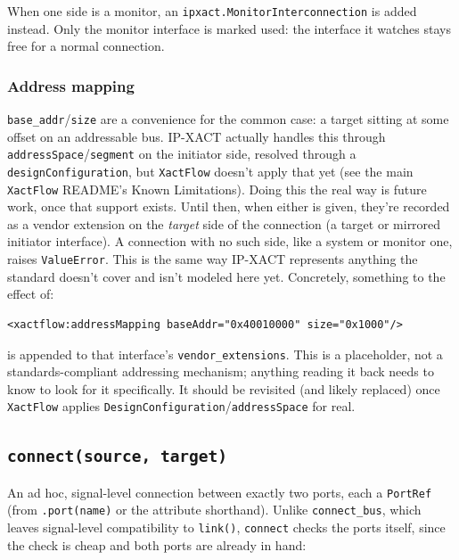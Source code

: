\documentclass[11pt]{article}
\newcommand{\code}[1]{\texttt{#1}}
\begin{document}
When one side is a monitor, an \code{ipxact.MonitorInterconnection} is added instead.
Only the monitor interface is marked used: the interface it watches stays free for a
normal connection.

\subsubsection{Address mapping}
\label{sec:address-mapping}

\code{base\_addr}/\code{size} are a convenience for the common case: a target sitting at
some offset on an addressable bus. IP-XACT actually handles this through
\code{addressSpace}/\code{segment} on the initiator side, resolved through a
\code{designConfiguration}, but \code{XactFlow} doesn't apply that yet (see the main
\code{XactFlow} README's Known Limitations). Doing this the real way is future work, once
that support exists. Until then, when either is given,
they're recorded as a vendor extension on the \emph{target} side of the connection (a
target or mirrored initiator interface). A connection with no such side, like a system
or monitor one, raises \code{ValueError}. This is the same way IP-XACT represents
anything the standard doesn't cover and isn't modeled here yet. Concretely, something to
the effect of:

\begin{lstlisting}[style=xmlblock, caption={Placeholder address-mapping vendor extension.}]
<xactflow:addressMapping baseAddr="0x40010000" size="0x1000"/>
\end{lstlisting}

is appended to that interface's \code{vendor\_extensions}. This is a placeholder, not a
standards-compliant addressing mechanism; anything reading it back needs to know to look
for it specifically. It should be revisited (and likely replaced) once \code{XactFlow}
applies \code{DesignConfiguration}/\code{addressSpace} for real.

\subsection{\texttt{connect(source, target)}}

An ad hoc, signal-level connection between exactly two ports, each a \code{PortRef}
(from \code{.port(name)} or the attribute shorthand). Unlike \code{connect\_bus}, which
leaves signal-level compatibility to \code{link()}, \code{connect} checks the ports
itself, since the check is cheap and both ports are already in hand:
\end{document}

